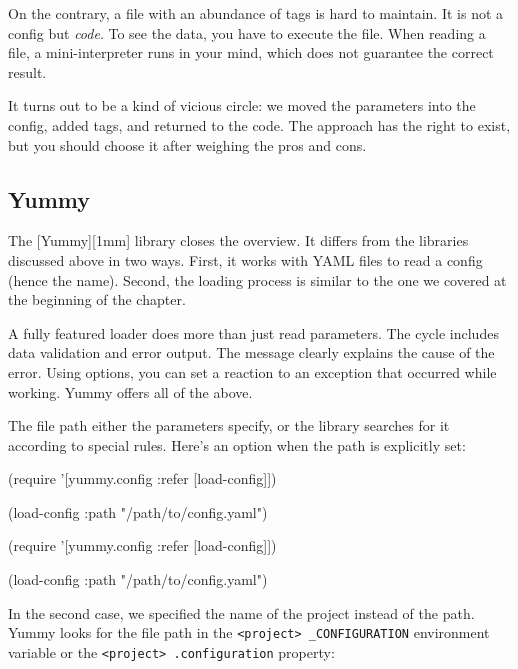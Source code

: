 On the contrary, a file with an abundance of tags is hard to maintain. It is not a config but \emph{code}. To see the data, you have to execute the file. When reading a file, a mini-interpreter runs in your mind, which does not guarantee the correct result.

It turns out to be a kind of vicious circle: we moved the parameters into the config, added tags, and returned to the code. The approach has the right to exist, but you should choose it after weighing the pros and cons.

\subsection{Yummy}


The [Yummy][1mm] library closes the overview. It differs from the libraries discussed above in two ways. First, it works with YAML files to read a config (hence the name). Second, the loading process is similar to the one we covered at the beginning of the chapter.

A fully featured loader does more than just read parameters. The cycle includes data validation and error output. The message clearly explains the cause of the error. Using options, you can set a reaction to an exception that occurred while working. Yummy offers all of the above.

The file path either the parameters specify, or the library searches for it according to special rules. Here's an option when the path is explicitly set:

\ifnarrow

\begin{clojure}
(require
  '[yummy.config :refer [load-config]])

(load-config
  {:path "/path/to/config.yaml"})
\end{clojure}

\else

\begin{clojure}
(require '[yummy.config :refer [load-config]])

(load-config {:path "/path/to/config.yaml"})
\end{clojure}

\fi

In the second case, we specified the name of the project instead of the path. Yummy looks for the file path in the \verb|<project> _CONFIGURATION| environment variable or the \verb|<project> .configuration| property:

